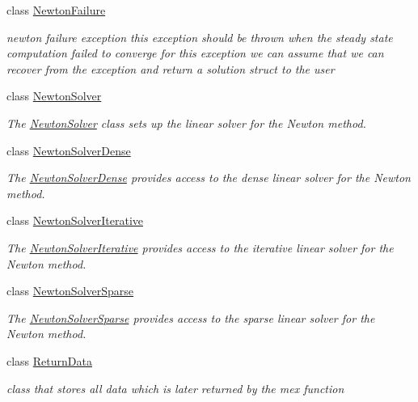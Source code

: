 \begin{DoxyCompactItemize}
class \mbox{\hyperlink{classamici_1_1_newton_failure}{Newton\+Failure}}
\begin{DoxyCompactList}\small\item\em newton failure exception this exception should be thrown when the steady state computation failed to converge for this exception we can assume that we can recover from the exception and return a solution struct to the user \end{DoxyCompactList}\item 
class \mbox{\hyperlink{classamici_1_1_newton_solver}{Newton\+Solver}}
\begin{DoxyCompactList}\small\item\em The \mbox{\hyperlink{classamici_1_1_newton_solver}{Newton\+Solver}} class sets up the linear solver for the Newton method. \end{DoxyCompactList}\item 
class \mbox{\hyperlink{classamici_1_1_newton_solver_dense}{Newton\+Solver\+Dense}}
\begin{DoxyCompactList}\small\item\em The \mbox{\hyperlink{classamici_1_1_newton_solver_dense}{Newton\+Solver\+Dense}} provides access to the dense linear solver for the Newton method. \end{DoxyCompactList}\item 
class \mbox{\hyperlink{classamici_1_1_newton_solver_iterative}{Newton\+Solver\+Iterative}}
\begin{DoxyCompactList}\small\item\em The \mbox{\hyperlink{classamici_1_1_newton_solver_iterative}{Newton\+Solver\+Iterative}} provides access to the iterative linear solver for the Newton method. \end{DoxyCompactList}\item 
class \mbox{\hyperlink{classamici_1_1_newton_solver_sparse}{Newton\+Solver\+Sparse}}
\begin{DoxyCompactList}\small\item\em The \mbox{\hyperlink{classamici_1_1_newton_solver_sparse}{Newton\+Solver\+Sparse}} provides access to the sparse linear solver for the Newton method. \end{DoxyCompactList}\item 
class \mbox{\hyperlink{classamici_1_1_return_data}{Return\+Data}}
\begin{DoxyCompactList}\small\item\em class that stores all data which is later returned by the mex function \end{DoxyCompactList}\item 

\end{DoxyCompactItemize}

